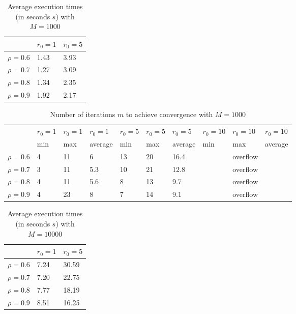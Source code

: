\documentclass[a4paper,11pt,openright]{report}
\begin{document}
\begin{table}[H]
\centering
\addtolength{\leftskip}{-1.5cm}
\addtolength{\rightskip}{-1.5cm}
\begin{tabular}{|c|ll|}
\hline
$ $ & $r_0 = 1$ & $r_0 = 5$ \\
\hline
$\rho = 0.6$ & 1.43 & 3.93 \\

$\rho = 0.7$ & 1.27 & 3.09 \\

$\rho = 0.8$ & 1.34 & 2.35 \\

$\rho = 0.9$ & 1.92 & 2.17 \\
\hline
\end{tabular}
\caption{Average execution
 times (in seconds $s$) with $M = 1000$}
\end{table}
\begin{table}[H]
\centering
\addtolength{\leftskip}{-1.5cm}
\addtolength{\rightskip}{-1.5cm}
\begin{tabular}{|c|lllllllll|}
\hline
$ $ & $r_0 = 1$ & $r_0 = 1$ & $r_0 = 1$ & $r_0 = 5$ & $r_0 = 5$ & $r_0 = 5$ & $r_0 = 10$ & $r_0 = 10$ & $r_0 = 10$  \\
$ $ & min & max & average & min & max & average & min & max & average \\ 
\hline
$\rho = 0.6$ & 4 & 11 & 6 & 13 & 20 & 16.4 &  & overflow &  \\

$\rho = 0.7$ & 3 & 11 & 5.3 & 10 & 21 & 12.8 &  & overflow &  \\

$\rho = 0.8$ & 4 & 11 & 5.6 & 8 & 13 & 9.7 &  & overflow & \\

$\rho = 0.9$ & 4 & 23 & 8 & 7 & 14 & 9.1 &  &overflow  & \\
\hline
\end{tabular}
\caption{Number of iterations $m$ to achieve convergence with $M = 1000$}
\end{table}
\begin{table}[H]
\centering
\addtolength{\leftskip}{-1.5cm}
\addtolength{\rightskip}{-1.5cm}
\begin{tabular}{|c|ll|}
\hline
$ $ & $r_0 = 1$ & $r_0 = 5$  \\
\hline
$\rho = 0.6$ & 7.24 & 30.59 \\

$\rho = 0.7$ & 7.20 & 22.75 \\

$\rho = 0.8$ & 7.77 & 18.19 \\

$\rho = 0.9$ & 8.51 & 16.25 \\
\hline
\end{tabular}
\caption{Average execution
 times (in seconds $s$) with $M = 10000$}
\end{table}
\end{document}
